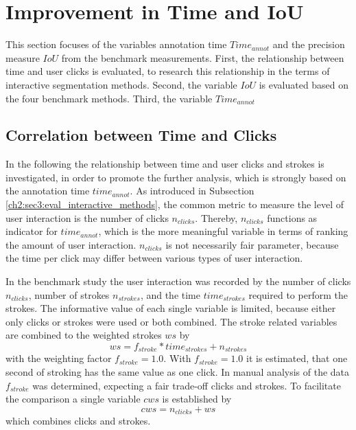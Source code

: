 
\section{Improvement in Time and IoU}\label{ord:ch5:sec1}

This section focuses of the variables annotation time $Time_{annot}$ and the precision measure $IoU$ from the benchmark measurements.
First, the relationship between time and user clicks is evaluated, to research this relationship in the terms of interactive segmentation methods.
Second, the variable $IoU$ is evaluated based on the four benchmark methods.
Third, the variable $Time_{annot}$ 


\subsection{Correlation between Time and Clicks}\label{ord:ch5:sec1:subsec1}

In the following the relationship between time and user clicks and strokes is investigated, in order to promote the further analysis, which is strongly based on the annotation time $time_{annot}$. 
As introduced in Subsection \ref{ch2:sec3:eval_interactive_methods}, the common metric to measure the level of user interaction is the number of clicks $n_{clicks}$.
Thereby, $n_{clicks}$ functions as indicator for $time_{annot}$, which is the more meaningful variable in terms of ranking the amount of user interaction.
$n_{clicks}$ is not necessarily fair parameter, because the time per click may differ between various types of user interaction.

In the benchmark study the user interaction was recorded by the number of clicks $n_{clicks}$, number of strokes $n_{strokes}$, and the time $time_{strokes}$ required to perform the strokes.
The informative value of each single variable is limited, because either only clicks or strokes were used or both combined.
The stroke related variables are combined to the weighted strokes $ws$ by
\begin{equation} \label{equ:ws}
	ws = f_{stroke} * time_{strokes} + n_{strokes} 
\end{equation}
with the weighting factor $f_{stroke}=1.0$.
With $f_{stroke}=1.0$ it is estimated, that one second of stroking has the same value as one click.
In manual analysis of the data $f_{stroke}$ was determined, expecting a fair trade-off clicks and strokes.
To facilitate the comparison a single variable $cws$ is established by 
\begin{equation}
	cws = n_{clicks} + ws
\end{equation}
which combines clicks and strokes.

